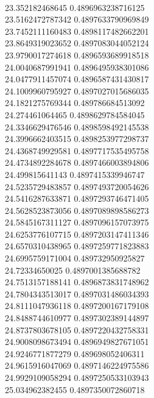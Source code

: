 { \\
23.352182468645 0.4896963238716125
 \\
23.5162472787342 0.4897633790969849
 \\
23.7452111160483 0.4898117482662201
 \\
23.8649319023652 0.4897083044052124
 \\
23.9790017274618 0.4896593689918518
 \\
24.0040687991941 0.4896495938301086
 \\
24.0477911457074 0.4896587431430817
 \\
24.1009960795927 0.4897027015686035
 \\
24.1821275769344 0.489786684513092
 \\
24.274461064465 0.4898629784584045
 \\
24.3346629476546 0.4898598492145538
 \\
24.3996662403515 0.4898253977298737
 \\
24.4368749929581 0.4897717535495758
 \\
24.4734892284678 0.4897466003894806
 \\
24.499815641143 0.4897415339946747
 \\
24.5235729483857 0.4897493720054626
 \\
24.5416287633871 0.4897293746471405
 \\
24.5628523873056 0.4897089898586273
 \\
24.5845167311127 0.4897096157073975
 \\
24.6253776107715 0.4897203147411346
 \\
24.6570310438965 0.4897259771823883
 \\
24.6995759171004 0.489732950925827
 \\
24.72334650025 0.4897001385688782
 \\
24.7513157188141 0.4896873831748962
 \\
24.7804343513017 0.4897031486034393
 \\
24.8111047936118 0.4897200167179108
 \\
24.8488744610977 0.4897302389144897
 \\
24.8737803678105 0.4897220432758331
 \\
24.9008098673494 0.4896949827671051
 \\
24.9246771877279 0.489698052406311
 \\
24.9615916047069 0.4897146224975586
 \\
24.9929109058294 0.4897250533103943
 \\
25.034962382455 0.4897350072860718
}
